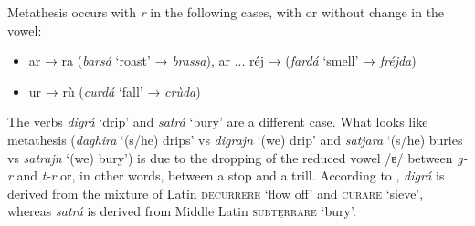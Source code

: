 Metathesis occurs with \textit{r} in the following cases, with or without change in the vowel:

\begin{itemize}
	\item ar → ra (\textit{barsá} `roast' → \textit{brassa}), ar ... réj → (\textit{fardá} `smell' → \textit{fréjda})
	\item ur → rù (\textit{curdá} `fall' → \textit{crùda})
\end{itemize}

The verbs \textit{digrá} `drip' and \textit{satrá} `bury' are a different case. What looks like metathesis (\textit{daghira} `(s/he) drips' vs \textit{digrajn} `(we) drip' and \textit{satjara} `(s/he) buries vs \textit{satrajn} `(we) bury') is due to the dropping of the reduced vowel /ɐ/ between \textit{g-r} and \textit{t-r} or, in other words, between a stop and a trill. According to \citet[311 and 973]{Decurtins2012}, \textit{digrá} is derived from the mixture of Latin \textsc{decu̱rrere} `flow off' and \textsc{cu̱rare} `sieve', whereas \textit{satrá} is derived from Middle Latin \textsc{subte̱rrare} `bury'.

